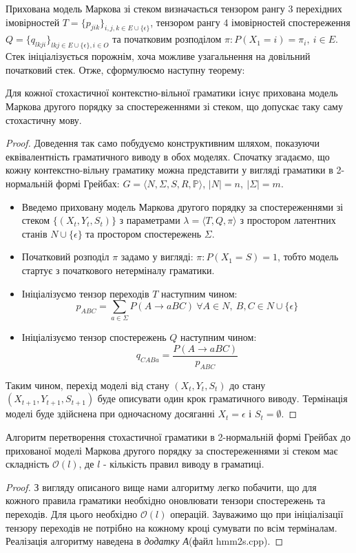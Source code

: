 Прихована модель Маркова зі стеком визначається тензором рангу 3 перехідних імовірностей $T = \{ p_{jik} \}_{i,j,k \in E \cup \{ \epsilon \} }$, тензором рангу 4 імовірностей спостереження $Q = \{ q_{lkji} \}_{lkj \in E \cup \{ \epsilon \}, i \in O }$ та початковим розподілом $ \pi \colon P(X_1 = i) = \pi_i,\ i \in E $. Стек ініціалізується порожнім, хоча можливе узагальнення на довільний початковий стек.
Отже, сформулюємо наступну теорему:
\begin{theorem}
  Для кожної стохастичної контекстно-вільної граматики існує прихована модель Маркова другого порядку за спостереженнями зі стеком, що допускає таку саму стохастичну мову.
\end{theorem}
\begin{proof}
  Доведення так само побудуємо конструктивним шляхом, показуючи еквівалентність граматичного виводу в обох моделях. Спочатку згадаємо, що кожну контекстно-вільну граматику можна представити у вигляді граматики в 2-нормальній формі Грейбах: $ G = \big\langle N, \Sigma, S, R, \mathbb{P}\big\rangle $, $|N| = n,\ |\Sigma| = m $.
  \begin{itemize}
    \item Введемо приховану модель Маркова другого порядку за спостереженнями зі стеком $ \{ (X_t, Y_t, S_t) \} $ з параметрами $\lambda = \big\langle T, Q, \pi \big\rangle$ з простором латентних станів $N \cup \{ \epsilon \}$ та простором спостережень $\Sigma$.
    \item Початковий розподіл $\pi$ задамо у вигляді: $ \pi \colon P(X_1 = S) = 1 $, тобто модель стартує з початкового нетерміналу граматики.
    \item Ініціалізуємо тензор переходів $T$ наступним чином:
    $$ p_{ABC} = \sum_{a \in \Sigma} P(A \rightarrow a B C) \ \forall A \in N,\ B, C \in N \cup \{ \epsilon \} $$
    \item Ініціалізуємо тензор спостережень $Q$ наступним чином:
    $$ q_{CABa} = \frac{P(A \rightarrow a B C)}{p_{ABC}} $$
  \end{itemize}
  Таким чином, перехід моделі від стану $(X_t, Y_t, S_t)$ до стану $(X_{t+1}, Y_{t+1}, S_{t+1})$ буде описувати один крок граматичного виводу. Термінація моделі буде здійснена при одночасному досяганні $ X_t = \epsilon$ і $S_t = \emptyset $.
\end{proof}
\begin{claim}
  Алгоритм перетворення стохастичної граматики в 2-нормальній формі Грейбах до прихованої моделі Маркова другого порядку за спостереженнями зі стеком має складність $\mathcal{O}(l)$, де $l$ - кількість правил виводу в граматиці.
\end{claim}
\begin{proof}
  З вигляду описаного вище нами алгоритму легко побачити, що для кожного правила граматики необхідно оновлювати тензори спостережень та переходів. Для цього необхідно $ \mathcal{O}(l) $ операцій. Зауважимо що при ініціалізації тензору переходів не потрібно на кожному кроці сумувати по всім терміналам. Реалізація алгоритму наведена в \textit{додатку А}(файл hmm2s.cpp).
\end{proof}

